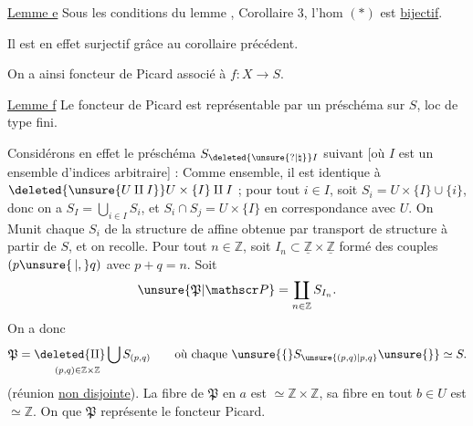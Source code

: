 \uline{Lemme e} Sous les conditions du lemme , Corollaire 3, l'hom $(*)$ est \uline{bijectif}.

Il est en effet surjectif grâce au corollaire précédent.

On a ainsi   foncteur de Picard associé à $f:X\to S$.

\uline{Lemme f} Le foncteur  de Picard est  représentable par un préschéma sur $S$, loc de type fini.


Considérons  en effet le préschéma  $S_{\deleted{\unsure{?|\natural}}I}$ suivant [où $I$ est un ensemble d'indices arbitraire] : Comme ensemble, il est identique à $\deleted{\unsure{U\amalg I}}U\times\{I\}\amalg I$ ; pour tout $i\in I$, soit $S_i=U\times\{I\}\cup\{i\}$, donc on a $S_I=\bigcup_{i\in I}S_i$, et $S_i\cap S_j=U\times\{I\}$ \unsure{$\simeq$} en correspondance  avec $U$. On Munit chaque $S_i$ de la structure de   affine obtenue par transport de structure à partir de $S$, et on recolle.
Pour tout $n\in\mathbb Z$, soit $I_n\subset\underline{\mathbb Z}\times\underline{\mathbb Z}$ formé des couples $(p\unsure{\,|,}q)$ avec $p+q=n$. Soit
\[
\unsure{\mathfrak P|\mathscr P}=\coprod_{n\in\mathbb Z} S_{I_n}.
\]
On a donc
\[
\mathfrak P=\mathop{\deleted{\amalg}\bigcup}_{(p,q)\in\mathbb Z\times\mathbb Z} S_{(p,q)} \qquad\text{où chaque }\unsure{\{}S_{\unsure{(p,q)|p,q}}\unsure{\}}\simeq S.
\]
(réunion \uline{non disjointe}). La fibre de $\mathfrak P$ en $a$ est $\simeq\mathbb Z\times\mathbb Z$, sa fibre en tout $b\in U$ est $\simeq\mathbb Z$. On  que $\mathfrak P$ représente le foncteur Picard.

